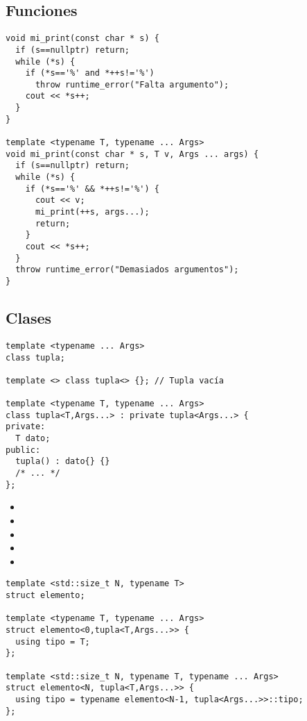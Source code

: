 \subsection{Funciones}

\begin{frame}[fragile]
\begin{lstlisting}
void mi_print(const char * s) {
  if (s==nullptr) return;
  while (*s) {
    if (*s=='%' and *++s!='%')
      throw runtime_error("Falta argumento");
    cout << *s++;
  }
}

template <typename T, typename ... Args>
void mi_print(const char * s, T v, Args ... args) {
  if (s==nullptr) return;
  while (*s) {
    if (*s=='%' && *++s!='%') {
      cout << v;
      mi_print(++s, args...);
      return;
    }
    cout << *s++;
  }
  throw runtime_error("Demasiados argumentos");
}
\end{lstlisting}
\end{frame}

\subsection{Clases}

\begin{frame}[fragile]
\begin{lstlisting}
template <typename ... Args>
class tupla;

template <> class tupla<> {}; // Tupla vacía

template <typename T, typename ... Args>
class tupla<T,Args...> : private tupla<Args...> {
private:
  T dato;
public:
  tupla() : dato{} {}
  /* ... */	
};
\end{lstlisting}
\begin{itemize}
  \item \pause {}
  \item {}
  \item {}
  \item {}
  \item {}
\end{itemize}
\end{frame}

\begin{frame}[fragile]
\begin{lstlisting}
template <std::size_t N, typename T>
struct elemento;

template <typename T, typename ... Args>
struct elemento<0,tupla<T,Args...>> {
  using tipo = T;
};

template <std::size_t N, typename T, typename ... Args>
struct elemento<N, tupla<T,Args...>> {
  using tipo = typename elemento<N-1, tupla<Args...>>::tipo;
};
\end{lstlisting}
\end{frame}

